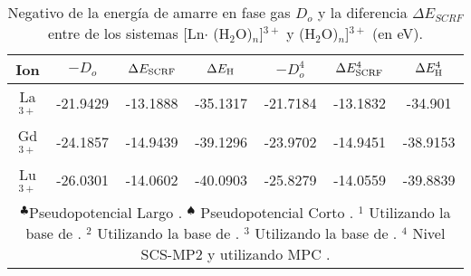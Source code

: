 \begin{table}[h!]
\centering
\caption{\footnotesize Negativo de la energ\'ia de amarre en fase gas
$D_o$ y la diferencia $\Delta E_{SCRF}$ entre de los sistemas [Ln$\cdot$
(H$_2$O)$_{n}$]$^{3+}$ y (H$_2$O)$_{n}$]$^{3+}$ (en eV).}
\begin{tabular}{c|cccccc}\hline\hline
Ion & $-D_o$ & $\Delta E_{\mbox{{\scriptsize SCRF}}}$ & 
$\Delta E_{\mbox{{\scriptsize H}}} $ 
& $-D_o^4$ & $\Delta E_{\mbox{{\scriptsize SCRF}}}^4$ & 
$\Delta E_{\mbox{{\scriptsize H}}}^4 $ \\ \hline
La$^{3+}$ &-21.9429 &-13.1888 &-35.1317 &-21.7184 &-13.1832 &-34.901\\ 
Gd$^{3+}$ &-24.1857 &-14.9439 &-39.1296 &-23.9702 &-14.9451 &-38.9153\\ 
Lu$^{3+}$ &-26.0301 &-14.0602 &-40.0903 &-25.8279 &-14.0559 &-39.8839\\ 
\hline 
\multicolumn{7}{p{11.0cm}}{
{\footnotesize $^\clubsuit$Pseudopotencial Largo \citep{Dolg1989}. 
$^\spadesuit$ Pseudopotencial Corto \citep{Cao2001}}.
{\footnotesize $^1$ Utilizando la base de \cite{Dolg1993}.} 
{\footnotesize $^2$ Utilizando la base de \cite{Yang2005}.}
{\footnotesize $^3$ Utilizando la base de \cite{Cao2002}.}  
{\footnotesize $^4$ Nivel SCS-MP2 \citep{Grim2003} y utilizando MPC 
\citep{Toma2005}.}}
\end{tabular}\label{tEB}\end{table}
